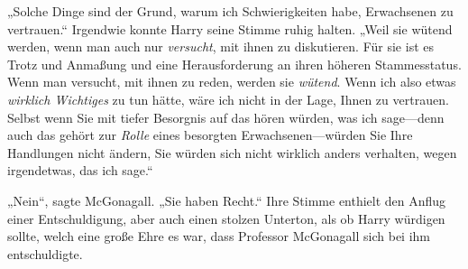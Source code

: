 „Solche Dinge sind der Grund, warum ich Schwierigkeiten habe, Erwachsenen zu vertrauen.“ Irgendwie konnte Harry seine Stimme ruhig halten. „Weil sie wütend werden, wenn man auch nur \emph{versucht}, mit ihnen zu diskutieren.
Für sie ist es Trotz und Anmaßung und eine Herausforderung an ihren höheren Stammesstatus. Wenn man versucht, mit ihnen zu reden, werden sie \emph{wütend}. Wenn ich also etwas \emph{wirklich Wichtiges} zu tun hätte, wäre ich nicht in der Lage, Ihnen zu vertrauen. Selbst wenn Sie mit tiefer Besorgnis auf das hören würden, was ich sage—denn auch das gehört zur \emph{Rolle} eines besorgten Erwachsenen—würden Sie Ihre Handlungen nicht ändern, Sie würden sich nicht wirklich anders verhalten, wegen irgendetwas, das ich sage.“

„Nein“, sagte McGonagall. „Sie haben Recht.“ Ihre Stimme enthielt den Anflug einer Entschuldigung, aber auch einen stolzen Unterton, als ob Harry würdigen sollte, welch eine große Ehre es war, dass Professor McGonagall sich bei ihm entschuldigte.


